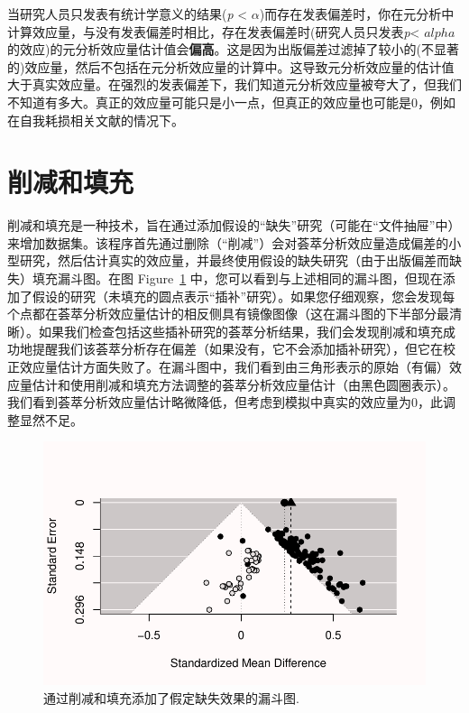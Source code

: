 \documentclass[
  letterpaper,
  DIV=11,
  numbers=noendperiod]{scrreprt}
\begin{document}
当研究人员只发表有统计学意义的结果(\emph{p} \textless{}
\(\alpha\))而存在发表偏差时，你在元分析中计算效应量，与没有发表偏差时相比，存在发表偏差时(研究人员只发表\emph{p}\textless{}
\(alpha\)的效应)的元分析效应量估计值会\textbf{偏高}。这是因为出版偏差过滤掉了较小的(不显著的)效应量，然后不包括在元分析效应量的计算中。这导致元分析效应量的估计值大于真实效应量。在强烈的发表偏差下，我们知道元分析效应量被夸大了，但我们不知道有多大。真正的效应量可能只是小一点，但真正的效应量也可能是0，例如在自我耗损相关文献的情况下。

\hypertarget{ux524aux51cfux548cux586bux5145}{%
\section{削减和填充}\label{ux524aux51cfux548cux586bux5145}}

削减和填充是一种技术，旨在通过添加假设的``缺失''研究（可能在``文件抽屉''中）来增加数据集。该程序首先通过删除（``削减''）会对荟萃分析效应量造成偏差的小型研究，然后估计真实的效应量，并最终使用假设的缺失研究（由于出版偏差而缺失）填充漏斗图。在图
Figure~\ref{fig-trimfill1}
中，您可以看到与上述相同的漏斗图，但现在添加了假设的研究（未填充的圆点表示``插补''研究）。如果您仔细观察，您会发现每个点都在荟萃分析效应量估计的相反侧具有镜像图像（这在漏斗图的下半部分最清晰）。如果我们检查包括这些插补研究的荟萃分析结果，我们会发现削减和填充成功地提醒我们该荟萃分析存在偏差（如果没有，它不会添加插补研究），但它在校正效应量估计方面失败了。在漏斗图中，我们看到由三角形表示的原始（有偏）效应量估计和使用削减和填充方法调整的荟萃分析效应量估计（由黑色圆圈表示）。我们看到荟萃分析效应量估计略微降低，但考虑到模拟中真实的效应量为0，此调整显然不足。

\begin{figure}

{\centering \includegraphics[width=1\textwidth,height=\textheight]{12-bias_files/figure-pdf/fig-trimfill1-1.pdf}

}

\caption{\label{fig-trimfill1}通过削减和填充添加了假定缺失效果的漏斗图.}

\end{figure}
\end{document}
